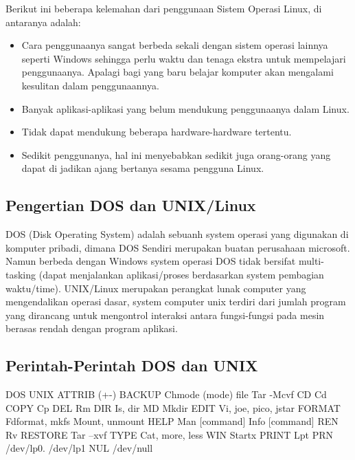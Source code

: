Berikut ini beberapa kelemahan dari penggunaan Sistem Operasi Linux, di antaranya adalah:

\begin{itemize}

\item Cara penggunaanya sangat berbeda sekali dengan sistem operasi lainnya seperti Windows sehingga perlu waktu dan tenaga ekstra untuk mempelajari penggunaanya. Apalagi bagi yang baru belajar komputer akan mengalami kesulitan dalam penggunaannya.

\item Banyak aplikasi-aplikasi yang belum mendukung penggunaanya dalam Linux.

\item Tidak dapat mendukung beberapa hardware-hardware tertentu.

\item Sedikit penggunanya, hal ini menyebabkan sedikit juga orang-orang yang dapat di jadikan ajang bertanya sesama pengguna Linux.

\end{itemize}

\subsection{Pengertian DOS dan UNIX/Linux}
DOS (Disk Operating System) adalah sebuanh system operasi yang digunakan di komputer pribadi, dimana DOS Sendiri merupakan buatan perusahaan microsoft. Namun berbeda dengan Windows system operasi DOS tidak bersifat multi-tasking (dapat menjalankan aplikasi/proses berdasarkan system pembagian waktu/time).
UNIX/Linux merupakan perangkat lunak computer yang mengendalikan operasi dasar, system computer unix terdiri dari jumlah program yang dirancang untuk mengontrol interaksi antara fungsi-fungsi pada mesin berasas rendah dengan program aplikasi.
\subsection{Perintah-Perintah DOS dan UNIX}
DOS	UNIX
ATTRIB (+-)
BACKUP	Chmode (mode) file
Tar -Mcvf
CD	Cd
COPY	Cp
DEL	Rm
DIR	Is, dir
MD	Mkdir
EDIT	Vi, joe, pico, jstar
FORMAT	Fdformat, mkfs
Mount, unmount
HELP	Man [command]
Info [command]
REN	Rv
RESTORE	Tar –xvf
TYPE	Cat, more, less
WIN	Startx
PRINT	Lpt
PRN	/dev/lp0. /dev/lp1
NUL	/dev/null

